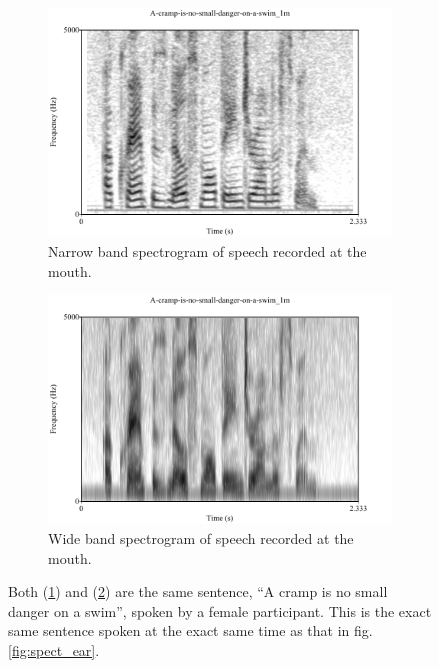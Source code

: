 \documentclass[dissertation,copyright]{uathesis}
\begin{document}
\begin{figure}
\centering
\begin{subfigure}{.475\textwidth}
  \centering
  \includegraphics[width=1\linewidth]{figure/spctgrmNarrowMouth_35.pdf}
  \caption{Narrow band spectrogram of speech recorded at the mouth.}
  \label{spctgrmNarrowMouth_35}
\end{subfigure}%
\hfill
\begin{subfigure}{.475\textwidth}
  \centering
  \includegraphics[width=1\linewidth]{figure/spctgrmWideMouth_35.pdf}
  \caption{Wide band spectrogram of speech recorded at the mouth.}
  \label{spctgrmWideMouth_35}
\end{subfigure}
\caption{Both (\ref{spctgrmNarrowMouth_35}) and (\ref{spctgrmWideMouth_35}) are the same sentence, ``A cramp is no small danger on a swim'', spoken by a female participant. This is the exact same sentence spoken at the exact same time as that in fig. \ref{fig:spect_ear}.}
\label{fig:spect_mouth}
\end{figure}
\end{document}

